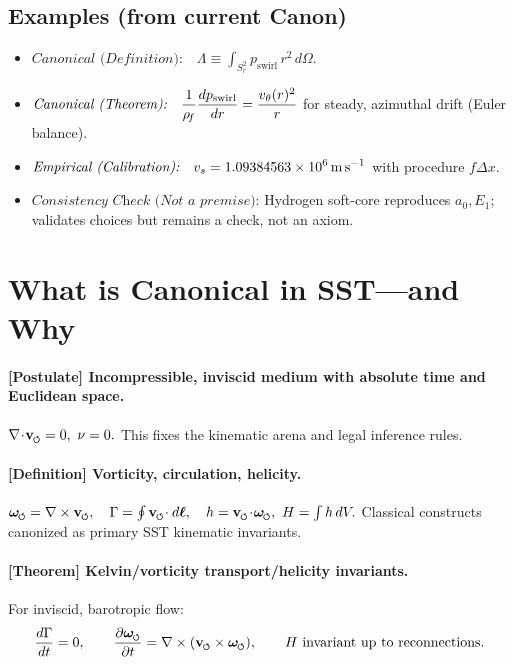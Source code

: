 \documentclass[11pt]{article}
\begin{document}
    \subsection*{Examples (from current Canon)}
    \begin{itemize}
        \item \(\displaystyle \textit{Canonical (Definition):}\quad \Lambda \equiv \int_{S_r^2} p_{\text{swirl}}\,r^2\,d\Omega.\)
        \item \(\displaystyle \textit{Canonical (Theorem):}\quad \frac{1}{\rho_{\!f}}\frac{dp_{\text{swirl}}}{dr}=\frac{v_\theta(r)^2}{r}\) for steady, azimuthal drift (Euler balance).
        \item \(\displaystyle \textit{Empirical (Calibration):}\quad v_s=1.09384563\times10^{6}\,\mathrm{m\,s^{-1}}\) with procedure \(f\Delta x\).
        \item \(\displaystyle \textit{Consistency Check (Not a premise):}\) Hydrogen soft-core reproduces \(a_0,E_1\); validates choices but remains a check, not an axiom.
    \end{itemize}

    \section*{What is Canonical in SST—and Why}

    \paragraph{[Postulate] Incompressible, inviscid medium with absolute time and Euclidean space.}
    \(\nabla\!\cdot\!\vswirl=0,\ \nu=0.\)
    This fixes the kinematic arena and legal inference rules.

    \paragraph{[Definition] Vorticity, circulation, helicity.}
    \(\omegas=\nabla\times \vswirl,\quad \Gamma=\oint \vswirl\!\cdot d\boldsymbol{\ell},\quad h=\vswirl\!\cdot\!\omegas,\ H=\int h\,dV.\)
    Classical constructs canonized as primary SST kinematic invariants.

    \paragraph{[Theorem] Kelvin/vorticity transport/helicity invariants.}
    For inviscid, barotropic flow:
    \[
        \frac{d\Gamma}{dt}=0,\qquad
        \pdv{\omegas}{t}=\nabla\times(\vswirl\times\omegas),\qquad
        \text{$H$ invariant up to reconnections}.
    \]
\end{document}
